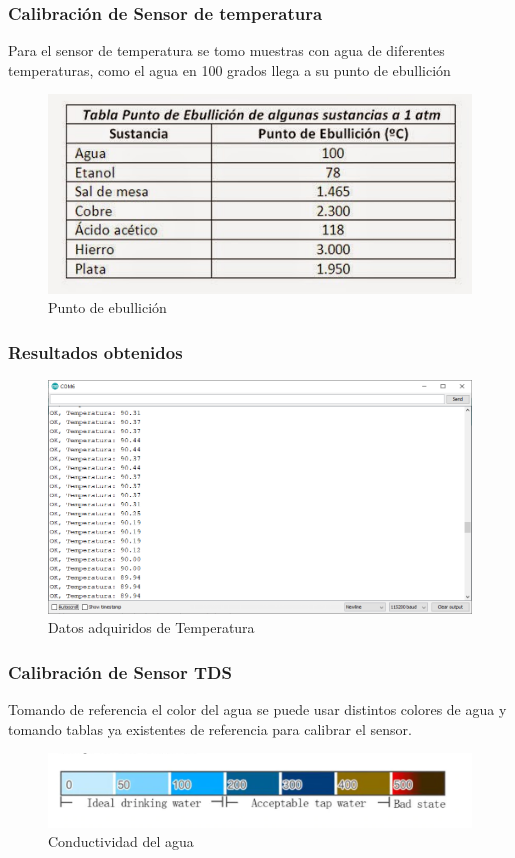 \documentclass[10pt,a4paper]{article}
\begin{document}
\subsubsection{Calibración de Sensor de temperatura}\label{temp}
Para el sensor de temperatura se tomo muestras con agua de diferentes temperaturas, como el agua en 100 grados llega a su punto de ebullición
\begin{figure}[H]
\centering
\includegraphics[scale=0.9]{ebullicion.jpg}
\caption{Punto de ebullición}
\end{figure}

\subsubsection*{Resultados obtenidos}
\begin{figure}[H]
\centering
\includegraphics[scale=0.5]{Resultados/resTemperatura}
\caption{Datos adquiridos de Temperatura}
\end{figure}

\subsubsection{Calibración de Sensor TDS}
Tomando de referencia el color del agua se puede usar distintos colores de agua y tomando tablas ya existentes de referencia para calibrar el sensor.
\begin{figure}[H]
\centering
\includegraphics[scale=0.5]{turbidez.PNG}
\caption{Conductividad del agua}
\end{figure}
\end{document}
